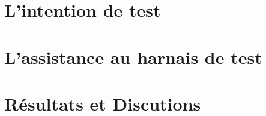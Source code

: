 \documentclass[
10pt, %
a4paper, %
oneside, %
headinclude,footinclude, %
BCOR5mm, %
]{scrartcl}
\begin{document}
\lipsum[5] %

\newpage 
\section{L'intention de test}

\lipsum[5] %

\newpage 
\section{L'assistance au harnais de test}

\lipsum[5] %


\newpage 
\section{Résultats et Discutions}



\lipsum[10] %




\renewcommand{\refname}{\spacedlowsmallcaps{References}} %
\newpage 



\end{document}
